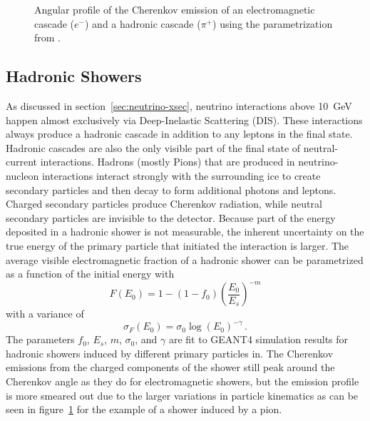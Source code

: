 \begin{figure}
    \centering
    
    \caption{Angular profile of the Cherenkov emission of an electromagnetic cascade ($e^-$) and a hadronic cascade ($\pi^+$) using the parametrization from \cite{RADEL2013102}.}
    \label{fig:cherenkov_angular_profile_cascade}
\end{figure}

\subsection{Hadronic Showers}
\label{sec:had-showers}
As discussed in section~\ref{sec:neutrino-xsec}, neutrino interactions above 10~GeV happen almost exclusively via Deep-Inelastic Scattering (DIS). These interactions always produce a hadronic cascade in addition to any leptons in the final state. Hadronic cascades are also the only visible part of the final state of neutral-current interactions. Hadrons (mostly Pions) that are produced in neutrino-nucleon interactions interact strongly with the surrounding ice to create secondary particles and then decay to form additional photons and leptons. Charged secondary particles produce Cherenkov radiation, while neutral secondary particles are invisible to the detector. Because part of the energy deposited in a hadronic shower is not measurable, the inherent uncertainty on the true energy of the primary particle that initiated the interaction is larger. The average visible electromagnetic fraction of a hadronic shower can be parametrized\cite{RADEL2013102} as a function of the initial energy with
\begin{equation}
    F(E_0) = 1 - (1-f_0)\left(\frac{E_0}{E_s}\right)^{-m}
\end{equation}
with a variance of
\begin{equation}
    \sigma_F(E_0) = \sigma_0 \log(E_0)^{-\gamma}\,.
\end{equation}
The parameters $f_0$, $E_s$, $m$, $\sigma_0$, and $\gamma$ are fit to GEANT4 simulation results for hadronic showers induced by different primary particles in\cite{RADEL2013102}.
The Cherenkov emissions from the charged components of the shower still peak around the Cherenkov angle as they do for electromagnetic showers, but the emission profile is more smeared out due to the larger variations in particle kinematics as can be seen in figure~\ref{fig:cherenkov_angular_profile_cascade} for the example of a shower induced by a pion.
